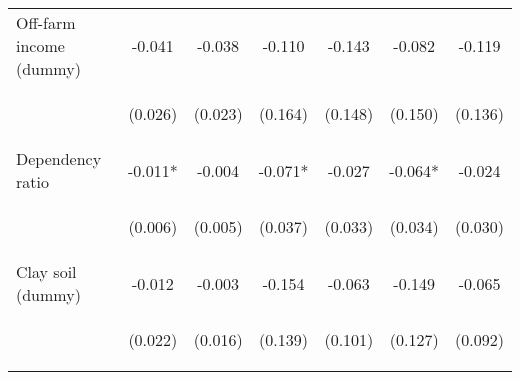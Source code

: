 \begin{center}
\begin{tabular}{lcccccc}
Off-farm income (dummy) & -0.041 & -0.038 & -0.110 & -0.143 & -0.082 & -0.119 \\
\vspace{4pt} & \begin{footnotesize}(0.026)\end{footnotesize} & \begin{footnotesize}(0.023)\end{footnotesize} & \begin{footnotesize}(0.164)\end{footnotesize} & \begin{footnotesize}(0.148)\end{footnotesize} & \begin{footnotesize}(0.150)\end{footnotesize} & \begin{footnotesize}(0.136)\end{footnotesize} \\
Dependency ratio & -0.011* & -0.004 & -0.071* & -0.027 & -0.064* & -0.024 \\
\vspace{4pt} & \begin{footnotesize}(0.006)\end{footnotesize} & \begin{footnotesize}(0.005)\end{footnotesize} & \begin{footnotesize}(0.037)\end{footnotesize} & \begin{footnotesize}(0.033)\end{footnotesize} & \begin{footnotesize}(0.034)\end{footnotesize} & \begin{footnotesize}(0.030)\end{footnotesize} \\
Clay soil (dummy) & -0.012 & -0.003 & -0.154 & -0.063 & -0.149 & -0.065 \\
\vspace{4pt} & \begin{footnotesize}(0.022)\end{footnotesize} & \begin{footnotesize}(0.016)\end{footnotesize} & \begin{footnotesize}(0.139)\end{footnotesize} & \begin{footnotesize}(0.101)\end{footnotesize} & \begin{footnotesize}(0.127)\end{footnotesize} & \begin{footnotesize}(0.092)\end{footnotesize} \\

\end{tabular}
\end{center}
